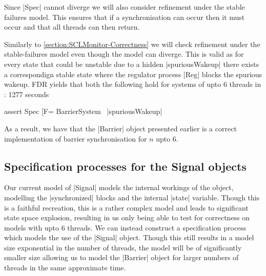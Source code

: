 Since |Spec| cannot diverge we will also consider refinement under the stable failures model. This ensures that if a synchronisation can occur then it must occur and that all threads can then return.


Similarly to \ref{section:SCLMonitor-Correctness} we will check refinement under the stable-failures model even though the model can diverge. This is valid as for every state that could be unstable due to a hidden |spuriousWakeup| there exists a correspondign stable state where the regulator process |Reg| blocks the spurious wakeup.
FDR yields that both the following hold for systems of upto 6 threads in : 1277 seconds

\begin{cspm}
assert Spec [F= BarrierSystem \ {|spuriousWakeup|}
\end{cspm}

As a result, we have that the |Barrier| object presented earlier is a correct implementation of barrier synchronisation for $n$ upto 6.

\subsection{Specification processes for the Signal objects}
Our current model of |Signal| models the internal workings of the object, modelling the |synchronized| blocks and the internal |state| variable. Though this is a faithful recreation, this is a rather complex model and leads to significant state space explosion, resulting in us only being able to test for correctness on models with upto 6 threads.
We can instead construct a specification process which models the use of the |Signal| object. Though this still results in a model size exponential in the number of threads, the model will be of significantly smaller size allowing us to model the |Barrier| object for larger numbers of threads in the same approximate time.

